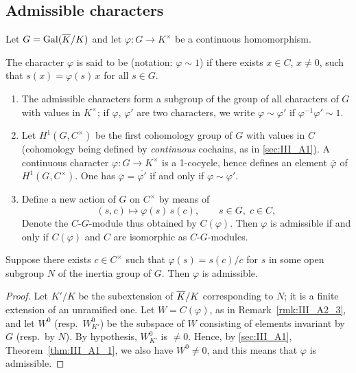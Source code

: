\begin{subappendices}
\subsection{Admissible characters}
\label{sec:III_A2}
Let $G = \operatorname{Gal}(\overline{K}/K)$ and let $\varphi\colon G \to K^\times$ be a
continuous homomorphism.
\begin{mydef}
	The character $\varphi$ is said to be %
	 (notation: $\varphi \sim 1$) if there
	exists $x \in C$, $x \ne 0$, such that $s(x) = \varphi(s)\, x$ for all
	$s \in G$.
\end{mydef}

\begin{obs}
\begin{enumerate}
\item The admissible characters form a subgroup of the group of all characters
	of $G$ with values in $K^\times$; if $\varphi$, $\varphi'$ are two
	characters, we write $\varphi \sim \varphi'$ if $\varphi^{-1} \varphi'
	\sim 1$.
\item Let $H^1(G, C^\times)$ be the first cohomology group of $G$ with values
	in $C$ (cohomology being defined by \emph{continuous} cochains, as in
	\ref{sec:III_A1}). A continuous character $\varphi \colon G \to
	K^\times$ is a 1-cocycle, hence defines an element $\overline{\varphi}$
	of $H^1(G, C^\times)$. One has $\overline{\varphi} =
	\overline{\varphi'}$ if and only if $\varphi \sim \varphi'$.

\dpage

\item\label{rmk:III_A2_3}
	Define a new action of $G$ on $C^\times$ by means of
	\[
		(s, c) \longmapsto \varphi(s)\, s(c),
		\qquad s\in G,\; c \in C,
	\]
	Denote the $C$-$G$-module thus obtained by $C(\varphi)$. Then $\varphi$
	is admissible if and only if $C(\varphi)$ and $C$ are isomorphic as
	$C$-$G$-modules.
\end{enumerate}
\end{obs}

\begin{prop}
	Suppose there exists $c \in C^\times$ such that $\varphi(s) = s(c)/c$
	for $s$ in some open subgroup $N$ of the inertia group of $G$. Then
	$\varphi$ is admissible.
\end{prop}
\begin{proof}
	Let $K'/K$ be the subextension of $\overline{K}/K$ corresponding to $N$; it
	is a finite extension of an unramified one. Let $W = C(\varphi)$, as in
	Remark~\ref{rmk:III_A2_3}, and let $W^0$ (resp.\ $W^0_{K'}$) be the
	subspace of $W$ consisting of elements invariant by $G$ (resp.\ by
	$N$). By hypothesis, $W_{K'}^0$ is $\ne 0$. Hence, by \ref{sec:III_A1},
	Theorem~\ref{thm:III_A1_1}, we also have $W^0 \ne 0$,
	and this means that $\varphi$ is admissible.
\end{proof}


\end{subappendices}
